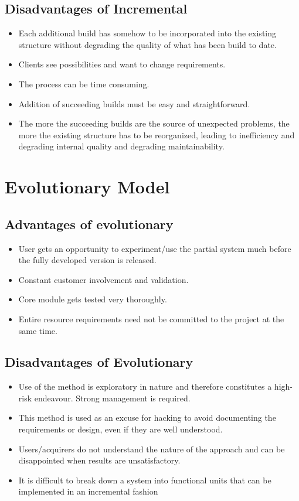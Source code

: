 \documentclass{article}
\begin{document}
\subsection{Disadvantages of Incremental}
\begin{itemize}
\item        Each additional build has somehow to be incorporated into the existing structure without degrading the quality of what has been build to date.
\item        Clients see possibilities and want to change requirements.
\item        The process can be time consuming.
\item        Addition of succeeding builds must be easy and straightforward.
\item        The more the succeeding builds are the source of unexpected problems, the more the existing structure has to be reorganized, leading to inefficiency and degrading internal quality and degrading maintainability.
\end{itemize}


\newpage{}
\section{Evolutionary Model}
\subsection{Advantages of evolutionary}
\begin{itemize}
\item        User gets an opportunity to experiment/use the partial system much before the fully developed version is released.
\item        Constant customer involvement and validation.
\item        Core module gets tested very thoroughly.
\item        Entire resource requirements need not be committed to the project at the same time.
\end{itemize}

\subsection{Disadvantages of Evolutionary}
\begin{itemize}
\item        Use of the method is exploratory in nature and therefore constitutes a high-risk endeavour. Strong management is required.
\item        This method is used as an excuse for hacking to avoid documenting the requirements or design, even if they are well understood. 
\item        Users/acquirers do not understand the nature of the approach and can be disappointed when results are unsatisfactory.
\item        It is difficult to break down a system into functional units that can be implemented in an incremental fashion
\end{itemize}
\end{document}
